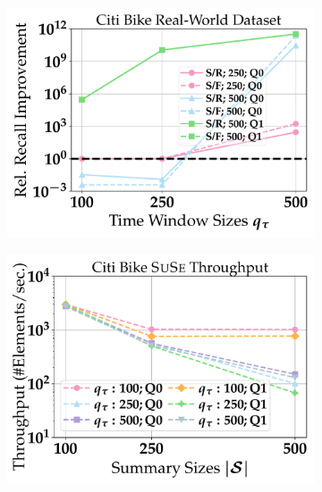 \begin{figure}[t]
	\centering
	\begin{subfigure}{.32\linewidth}
		\centering
		\includegraphics[width=1.0\linewidth]{revision_plots/CitiBike_queries.pdf}
		\vspace{-18pt}
		\caption{}
		\label{plot:citi_bike_average_total_match_ratio}
	\end{subfigure}
	\hfill
	\begin{subfigure}{.32\linewidth}
		\centering
		\includegraphics[width=1.0\linewidth]{revision_plots/CitiBike_throughput_lineplot.pdf}
		\vspace{-18pt}
		\caption{}
		\label{plot:citi_bike_throughput}
	\end{subfigure}

\end{figure}
